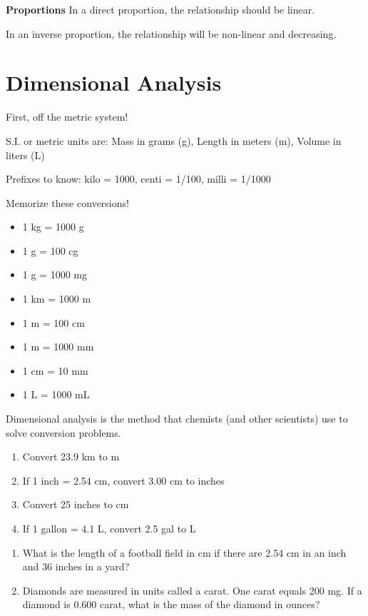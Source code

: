 \documentclass[../hchem.tex]{subfiles}
\begin{document}
\textbf{Proportions}
In a direct proportion, the relationship should be linear.

In an inverse proportion, the relationship will be non-linear and decreasing.

\section{Dimensional Analysis}
First, off the metric system!

S.I. or metric units are: Mass in grams (g), Length in meters (m), Volume in liters (L)

Prefixes to know: kilo = 1000, centi = 1/100, milli = 1/1000

Memorize these conversions!
\begin{itemize}
    \item 1 kg = 1000 g 
    \item 1 g = 100 cg 
    \item 1 g = 1000 mg 
    \item 1 km = 1000 m 
    \item 1 m = 100 cm 
    \item 1 m = 1000 mm 
    \item 1 cm = 10 mm 
    \item 1 L = 1000 mL 
\end{itemize}

Dimensional analysis is the method that chemists (and other scientists) use to solve conversion problems.

\ex  
\begin{enumerate}
    \item Convert 23.9 km to m 
    \item If 1 inch = 2.54 cm, convert 3.00 cm to inches
    \item Convert 25 inches to cm
    \item If 1 gallon = 4.1 L, convert 2.5 gal to L
\end{enumerate}

\ex  
\begin{enumerate}
    \item What is the length of a football field in cm if there are 2.54 cm in an inch and 36 inches in a yard?
    \item Diamonds are measured in units called a carat. One carat equals 200 mg. If a diamond is 0.600 carat, what is the mass of the diamond in ounces?
\end{enumerate}
\end{document}
